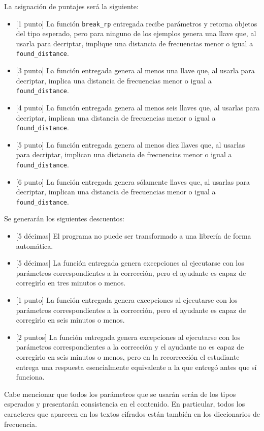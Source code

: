 La asignación de puntajes será la siguiente:
\begin{itemize}
  \item\text{}[1 punto] La función \texttt{break\_rp} entregada recibe parámetros y retorna objetos del tipo esperado, pero para ninguno de los ejemplos genera una llave que, al usarla para decriptar, implique una distancia de frecuencias menor o igual a \texttt{found\_distance}. 
  \item\text{}[3 punto] La función entregada genera al menos una llave que, al usarla para decriptar, implica una distancia de frecuencias menor o igual a \texttt{found\_distance}. 
  \item\text{}[4 punto] La función entregada genera al menos seis llaves que, al usarlas para decriptar, implican una distancia de frecuencias menor o igual a \texttt{found\_distance}. 
  \item\text{}[5 punto] La función entregada genera al menos diez llaves que, al usarlas para decriptar, implican una distancia de frecuencias menor o igual a \texttt{found\_distance}. 
  \item\text{}[6 punto] La función entregada genera sólamente llaves que, al usarlas para decriptar, implican una distancia de frecuencias menor o igual a \texttt{found\_distance}. 
\end{itemize}

Se generarán los siguientes descuentos:
\begin{itemize}
  \item\text{}[5 décimas] El programa no puede ser transformado a una librería de forma automática.
  \item\text{}[5 décimas] La función entregada genera excepciones al ejecutarse con los parámetros correspondientes a la corrección, pero el ayudante es capaz de corregirlo en tres minutos o menos.
  \item\text{}[1 punto] La función entregada genera excepciones al ejecutarse con los parámetros correspondientes a la corrección, pero el ayudante es capaz de corregirlo en seis minutos o menos.
  \item\text{}[2 puntos] La función entregada genera excepciones al ejecutarse con los parámetros correspondientes a la corrección y el ayudante no es capaz de corregirlo en seis minutos o menos, pero en la recorrección el estudiante entrega una respuesta esencialmente equivalente a la que entregó antes que sí funciona.
  
\end{itemize}
    Cabe mencionar que todos los parámetros que se usarán serán de los tipos esperados y presentarán consistencia en el contenido. En particular, todos los caracteres que aparecen en los textos cifrados están también en los diccionarios de frecuencia.


\medskip
